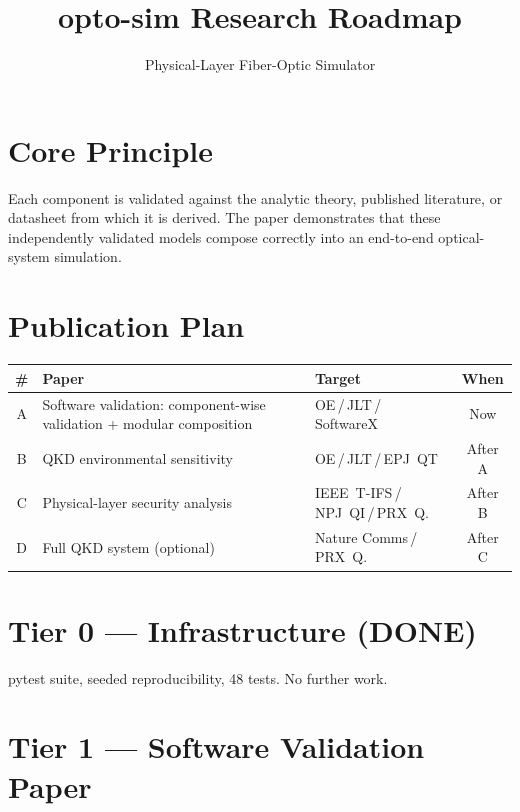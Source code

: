 \documentclass[11pt,a4paper]{article}
\begin{document}
\title{\vspace{-1cm}\textcolor{highlightblue}{\textbf{opto-sim Research Roadmap}}}
\author{Physical-Layer Fiber-Optic Simulator}
\date{}
\maketitle

\section{Core Principle}

Each component is validated against the analytic theory, published literature,
or datasheet from which it is derived. The paper demonstrates that these
independently validated models compose correctly into an end-to-end
optical-system simulation.

\section{Publication Plan}

{\small
\begin{tabularx}{\textwidth}{c L{5cm} L{3.5cm} c}
\toprule
\# & Paper & Target & When \\
\midrule
A & Software validation: component-wise validation + modular composition
    & OE\,/\,JLT\,/\,SoftwareX & Now \\
B & QKD environmental sensitivity
    & OE\,/\,JLT\,/\,EPJ~QT & After A \\
C & Physical-layer security analysis
    & IEEE~T-IFS\,/\,NPJ~QI\,/\,PRX~Q. & After B \\
D & Full QKD system (optional)
    & Nature Comms\,/\,PRX~Q. & After C \\
\bottomrule
\end{tabularx}}

\section{Tier 0 --- Infrastructure (DONE)}

pytest suite, seeded reproducibility, 48 tests. No further work.

\section{Tier 1 --- Software Validation Paper}
\end{document}
